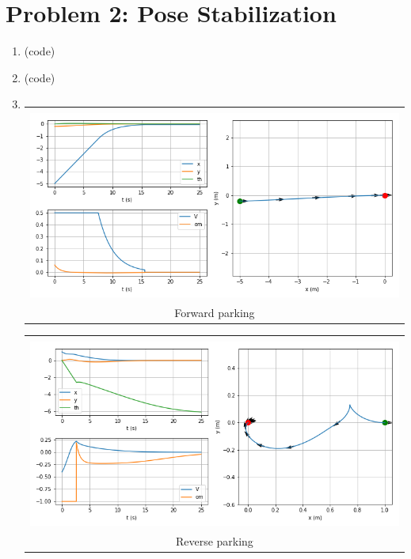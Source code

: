 \documentclass{article}
\begin{document}
\section*{Problem 2: Pose Stabilization}

	\begin{enumerate}[label=(\roman*)]
		
	\item %
	(code)
	
	\item %
	(code)
	
	\item %
	\begin{tabular}[t]{c}
		\hline \\
		\includegraphics[width=1.0\textwidth]{img/sim_parking_forward.png} \\
		Forward parking \\
		\hline
	\end{tabular}
	\begin{tabular}[t]{c}
		\hline \\
		\includegraphics[width=1.0\textwidth]{img/sim_parking_reverse.png} \\
		Reverse parking \\
		\hline
	\end{tabular}

\end{enumerate}
\end{document}
